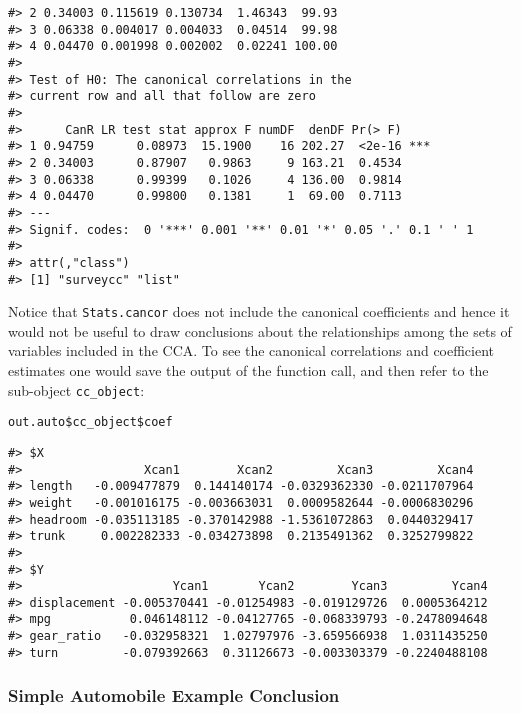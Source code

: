 \begin{verbatim}
#> 2 0.34003 0.115619 0.130734  1.46343  99.93                               
#> 3 0.06338 0.004017 0.004033  0.04514  99.98                               
#> 4 0.04470 0.001998 0.002002  0.02241 100.00                               
#> 
#> Test of H0: The canonical correlations in the 
#> current row and all that follow are zero
#> 
#>      CanR LR test stat approx F numDF  denDF Pr(> F)    
#> 1 0.94759      0.08973  15.1900    16 202.27  <2e-16 ***
#> 2 0.34003      0.87907   0.9863     9 163.21  0.4534    
#> 3 0.06338      0.99399   0.1026     4 136.00  0.9814    
#> 4 0.04470      0.99800   0.1381     1  69.00  0.7113    
#> ---
#> Signif. codes:  0 '***' 0.001 '**' 0.01 '*' 0.05 '.' 0.1 ' ' 1
#> 
#> attr(,"class")
#> [1] "surveycc" "list"
\end{verbatim}

Notice that \texttt{Stats.cancor} does not include the canonical coefficients and hence it would not be useful to draw conclusions about the relationships among the sets of variables included in the CCA. To see the canonical correlations and coefficient estimates one would save the output of the function call, and then refer to the sub-object \texttt{cc\_object}:

\begin{verbatim}
out.auto$cc_object$coef
\end{verbatim}

\begin{verbatim}
#> $X
#>                 Xcan1        Xcan2         Xcan3         Xcan4
#> length   -0.009477879  0.144140174 -0.0329362330 -0.0211707964
#> weight   -0.001016175 -0.003663031  0.0009582644 -0.0006830296
#> headroom -0.035113185 -0.370142988 -1.5361072863  0.0440329417
#> trunk     0.002282333 -0.034273898  0.2135491362  0.3252799822
#> 
#> $Y
#>                     Ycan1       Ycan2        Ycan3         Ycan4
#> displacement -0.005370441 -0.01254983 -0.019129726  0.0005364212
#> mpg           0.046148112 -0.04127765 -0.068339793 -0.2478094648
#> gear_ratio   -0.032958321  1.02797976 -3.659566938  1.0311435250
#> turn         -0.079392663  0.31126673 -0.003303379 -0.2240488108
\end{verbatim}

\hypertarget{simple-automobile-example-conclusion}{%
\subsubsection{Simple Automobile Example Conclusion}\label{simple-automobile-example-conclusion}}


